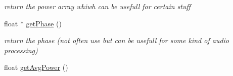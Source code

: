 \begin{DoxyCompactItemize}
\begin{DoxyCompactList}\small\item\em return the power array whiwh can be usefull for certain stuff \end{DoxyCompactList}\item 
float $\ast$ \hyperlink{classAudioManager_aed9c2968548b1c3f388616423fc45ad8}{get\+Phase} ()\hypertarget{classAudioManager_aed9c2968548b1c3f388616423fc45ad8}{}\label{classAudioManager_aed9c2968548b1c3f388616423fc45ad8}

\begin{DoxyCompactList}\small\item\em return the phase (not often use but can be usefull for some kind of audio processing) \end{DoxyCompactList}\item 
float \hyperlink{classAudioManager_ac7e561ba8fd78bfae235bfc18bf83ce1}{get\+Avg\+Power} ()\hypertarget{classAudioManager_ac7e561ba8fd78bfae235bfc18bf83ce1}{}\label{classAudioManager_ac7e561ba8fd78bfae235bfc18bf83ce1}


\end{DoxyCompactItemize}

